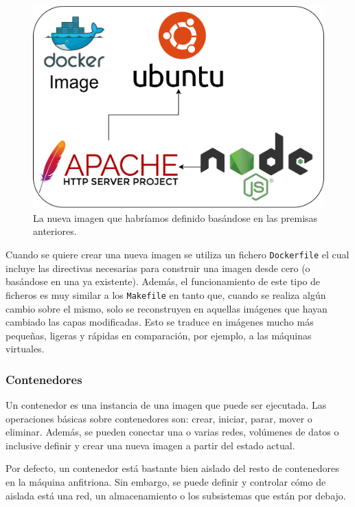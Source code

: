 \begin{figure}[H]
    \centering
    \includegraphics[width=\linewidth]{pictures/sample-image.png}
    \caption{La nueva imagen que habríamos definido basándose en las premisas anteriores.}
    \label{fig:sample-image}
\end{figure}

Cuando se quiere crear una nueva imagen se utiliza un fichero \texttt{Dockerfile}
el cual incluye las directivas necesarias para construir una imagen desde cero (o
basándose en una ya existente). Además, el funcionamiento de este tipo de ficheros
es muy similar a los \texttt{Makefile} en tanto que, cuando se realiza algún cambio
sobre el mismo, solo se reconstruyen en aquellas imágenes que hayan cambiado las
capas modificadas. Esto se traduce en imágenes mucho más pequeñas, ligeras y rápidas
en comparación, por ejemplo, a las máquinas virtuales.

\subsubsection*{Contenedores}
Un contenedor es una instancia de una imagen que puede ser ejecutada. Las operaciones
básicas sobre contenedores son: crear, iniciar, parar, mover o eliminar. Además, se
pueden conectar una o varias redes, volúmenes de datos o inclusive definir y crear
una nueva imagen a partir del estado actual.

Por defecto, un contenedor está bastante bien aislado del resto de contenedores en la
máquina anfitriona. Sin embargo, se puede definir y controlar cómo de aislada está
una red, un almacenamiento o los subsistemas que están por debajo.

